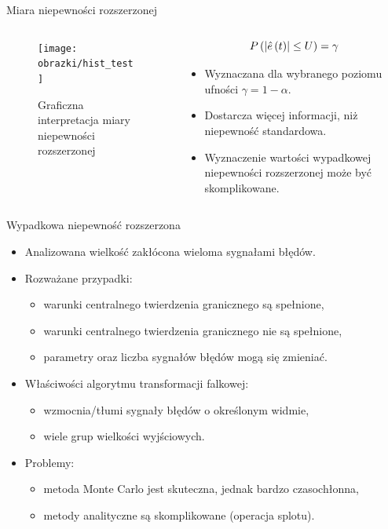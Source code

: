 \documentclass[12pt, polish, aspectratio = 169]{slides}
\begin{document}

\begin{frame}{Miara niepewności rozszerzonej}
\begin{columns}
\begin{column}{0.5\textwidth}
	\begin{figure}
	\texttt{[image: obrazki/hist\_test]}
	\caption{Graficzna interpretacja miary niepewności rozszerzonej}
	\end{figure}
\end{column}
\begin{column}{0.5\textwidth}
	\begin{equation}
	P \left(\left|\hat{e} \left(t\right)\right| \le U\right) = \gamma \label{eq:unc_definition}
	\end{equation}
	\begin{itemize}
	\item Wyznaczana dla wybranego poziomu ufności $\gamma = 1 - \alpha$.
	\item Dostarcza więcej informacji, niż niepewność standardowa.
	\item Wyznaczenie wartości wypadkowej niepewności rozszerzonej może być skomplikowane.
	\end{itemize}
\end{column}
\end{columns}
\end{frame}

\begin{frame}{Wypadkowa niepewność rozszerzona}
\begin{itemize}
\item Analizowana wielkość zakłócona wieloma sygnałami błędów.
\item Rozważane przypadki:
	\begin{itemize}
	\item warunki centralnego twierdzenia granicznego są spełnione,
	\item warunki centralnego twierdzenia granicznego nie są spełnione,
	\item parametry oraz liczba sygnałów błędów mogą się zmieniać.
	\end{itemize}
\item Właściwości algorytmu transformacji falkowej:
	\begin{itemize}
	\item wzmocnia/tłumi sygnały błędów o określonym widmie,
	\item wiele grup wielkości wyjściowych.
	\end{itemize}
\item Problemy:
	\begin{itemize}
	\item metoda Monte Carlo jest skuteczna, jednak bardzo czasochłonna,
	\item metody analityczne są skomplikowane (operacja splotu).
	\end{itemize}
\end{itemize}
\end{frame}
\end{document}
